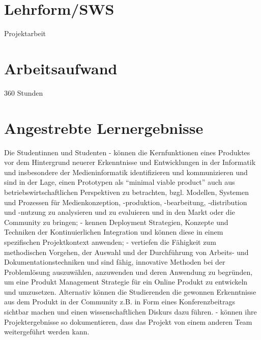 \section*{Lehrform/SWS
\label{/mi-2017/modulbeschreibungen-master/MA_Modul_Projekt_Verwertung}}\label{lehrformsws-pathlabelmi-2017modulbeschreibungen-mastermaux5fmodulux5fprojektux5fverwertung}

Projektarbeit

\section*{Arbeitsaufwand
\label{/mi-2017/modulbeschreibungen-master/MA_Modul_Projekt_Verwertung}}\label{arbeitsaufwand-pathlabelmi-2017modulbeschreibungen-mastermaux5fmodulux5fprojektux5fverwertung}

360 Stunden

\section*{Angestrebte
Lernergebnisse\label{/mi-2017/modulbeschreibungen-master/MA_Modul_Projekt_Verwertung}}\label{angestrebte-lernergebnissepathlabelmi-2017modulbeschreibungen-mastermaux5fmodulux5fprojektux5fverwertung}

Die Studentinnen und Studenten - können die Kernfunktionen eines
Produktes vor dem Hintergrund neuerer Erkenntnisse und Entwicklungen in
der Informatik und insbesondere der Medieninformatik identifizieren und
kommunizieren und sind in der Lage, einen Prototypen als ``minimal
viable product'' auch aus betriebswirtschaftlichen Perspektiven zu
betrachten, bzgl. Modellen, Systemen und Prozessen für Medienkonzeption,
-produktion, -bearbeitung, -distribution und -nutzung zu analysieren und
zu evaluieren und in den Markt oder die Community zu bringen; - kennen
Deployment Strategien, Konzepte und Techniken der Kontinuierlichen
Integration und können diese in einem spezifischen Projektkontext
anwenden; - vertiefen die Fähigkeit zum methodischen Vorgehen, der
Auswahl und der Durchführung von Arbeits- und Dokumentationstechniken
und sind fähig, innovative Methoden bei der Problemlösung auszuwählen,
anzuwenden und deren Anwendung zu begründen, um eine Produkt Management
Strategie für ein Online Produkt zu entwickeln und umzusetzen.
Alternativ können die Studierenden die gewonnen Erkenntnisse aus dem
Produkt in der Community z.B. in Form eines Konferenzbeitrags sichtbar
machen und einen wissenschaftlichen Diskurs dazu führen. - können ihre
Projektergebnisse so dokumentieren, dass das Projekt von einem anderen
Team weitergeführt werden kann.

